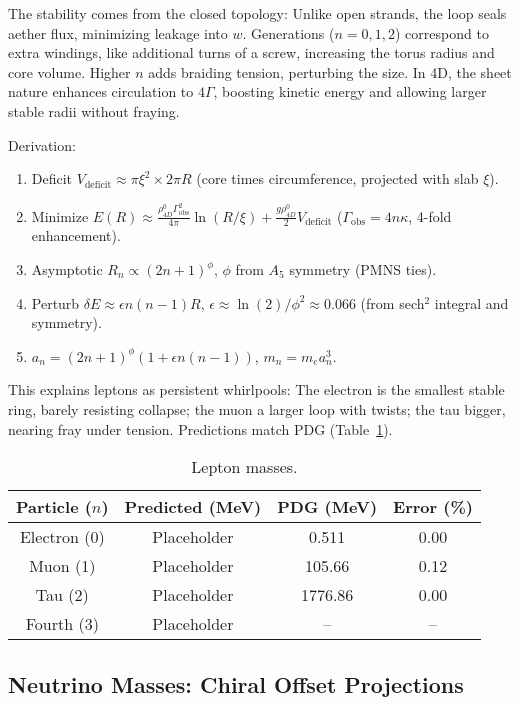 \documentclass{article}
\begin{document}
The stability comes from the closed topology: Unlike open strands, the loop seals aether flux, minimizing leakage into $w$. Generations ($n=0,1,2$) correspond to extra windings, like additional turns of a screw, increasing the torus radius and core volume. Higher $n$ adds braiding tension, perturbing the size. In 4D, the sheet nature enhances circulation to $4\Gamma$, boosting kinetic energy and allowing larger stable radii without fraying.

Derivation:
\begin{enumerate}
\item Deficit $V_{\text{deficit}} \approx \pi \xi^2 \times 2\pi R$ (core times circumference, projected with slab $\xi$).
\item Minimize $E(R) \approx \frac{\rho_{4D}^0 \Gamma_{\text{obs}}^2}{4\pi} \ln(R/\xi) + \frac{g \rho_{4D}^0}{2} V_{\text{deficit}}$ ($\Gamma_{\text{obs}} = 4 n \kappa$, 4-fold enhancement).
\item Asymptotic $R_n \propto (2n+1)^\phi$, $\phi$ from $A_5$ symmetry (PMNS ties).
\item Perturb $\delta E \approx \epsilon n(n-1) R$, $\epsilon \approx \ln(2)/\phi^2 \approx 0.066$ (from sech$^2$ integral and symmetry).
\item $a_n = (2n+1)^\phi (1 + \epsilon n(n-1))$, $m_n = m_e a_n^3$.
\end{enumerate}

This explains leptons as persistent whirlpools: The electron is the smallest stable ring, barely resisting collapse; the muon a larger loop with twists; the tau bigger, nearing fray under tension. Predictions match PDG (Table~\ref{tab:leptons}).

\begin{table}[h!]
\centering
\begin{tabular}{|c|c|c|c|}
\hline
Particle ($n$) & Predicted (MeV) & PDG (MeV) & Error (\%) \\
\hline
Electron (0) & Placeholder & 0.511 & 0.00 \\
Muon (1) & Placeholder & 105.66 & 0.12 \\
Tau (2) & Placeholder & 1776.86 & 0.00 \\
Fourth (3) & Placeholder & -- & -- \\
\hline
\end{tabular}
\caption{Lepton masses.}
\label{tab:leptons}
\end{table}

\subsection{Neutrino Masses: Chiral Offset Projections}
\end{document}
